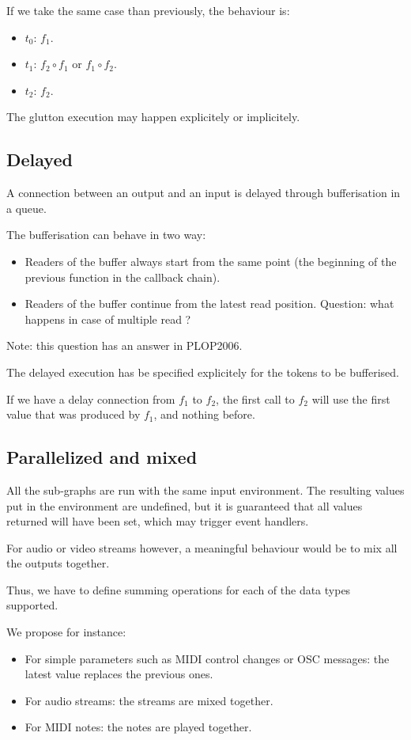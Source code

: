 \documentclass{article}
\begin{document}
    If we take the same case than previously, the behaviour is:
    \begin{itemize}
        \item $t_0$: $f_1$.
        \item $t_1$: $f_2 \circ f_1$ or $f_1 \circ f_2$.
        \item $t_2$: $f_2$. 
    \end{itemize}

    The glutton execution may happen explicitely or implicitely.
    
	\subsection{Delayed}
	A connection between an output and an input is delayed through bufferisation in a queue.
	
	The bufferisation can behave in two way:
	\begin{itemize}
		\item Readers of the buffer always start from the same point (the beginning of the previous function in the callback chain).
		\item Readers of the buffer continue from the latest read position.
		Question: what happens in case of multiple read ?
	\end{itemize}
	
    Note: this question has an answer in PLOP2006.
    
    The delayed execution has be specified explicitely for the tokens to be bufferised.
    
    If we have a delay connection from $f_1$ to $f_2$, the first call to $f_2$ will use the first value that was produced by $f_1$, and nothing before.
	
	\subsection{Parallelized and mixed}
	All the sub-graphs are run with the same input environment. 
	The resulting values put in the environment are undefined, but it is guaranteed that all values returned will have been set, which may trigger event handlers.
    
    For audio or video streams however, a meaningful behaviour would be to mix all the outputs together.
    
    Thus, we have to define summing operations for each of the data types supported.
    
    We propose for instance: 
    \begin{itemize}
        \item For simple parameters such as MIDI control changes or OSC messages: the latest value replaces the previous ones.
        \item For audio streams: the streams are mixed together.
        \item For MIDI notes: the notes are played together.
    \end{itemize}
\end{document}
